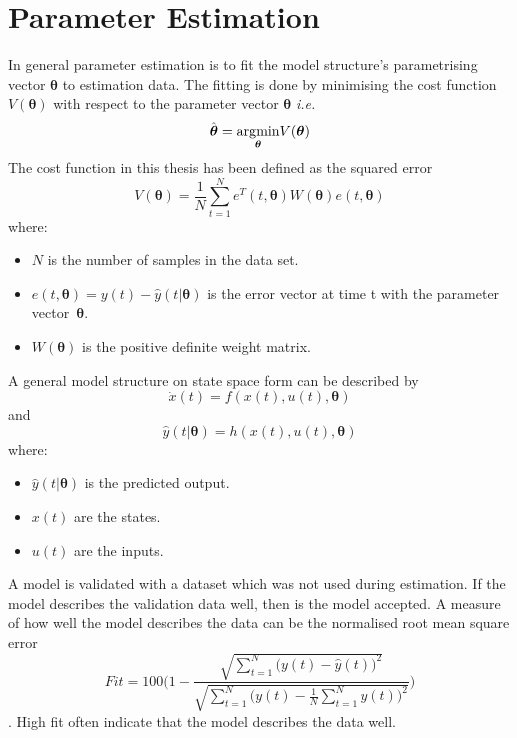 \section{Parameter Estimation} 
In general parameter estimation is to fit the model structure's parametrising vector $\boldsymbol{\theta}$ to estimation data. The fitting is done by minimising the cost function $V(\boldsymbol{\theta})$ with respect to the parameter vector $\boldsymbol{\theta}$ \emph{i.e.}
\begin{equation}
\hat{\boldsymbol{\theta}} = \underset{\boldsymbol{\theta}}{\operatorname*{\arg\!\min}} V(\boldsymbol{\theta})
\end{equation}
The cost function in this thesis has been defined as the squared error
\begin{equation}
    V(\boldsymbol{\theta}) = \frac{1}{N} \sum_{t=1}^{N} e^T(t,\boldsymbol{\theta}) W(\boldsymbol{\theta})  e(t,\boldsymbol{\theta})
\end{equation}
where:
\begin{itemize}
    \item $N$ is the number of samples in the data set.
    \item $e(t,\boldsymbol{\theta}) = y(t) - \hat{y}(t|\boldsymbol{\theta})$ is the error vector at time t with the parameter vector~$\boldsymbol{\theta}$.
    \item $W(\boldsymbol{\theta})$ is the positive definite weight matrix.
\end{itemize}

A general model structure on state space form can be described by
\begin{equation}
\dot{x}(t) = f(x(t), u(t), \boldsymbol{\theta})
\end{equation}
and
\begin{equation}
\hat{y}(t|\boldsymbol{\theta}) = h(x(t), u(t), \boldsymbol{\theta})
\end{equation}
 where:
 \begin{itemize}
  \item $\hat{y}(t|\boldsymbol{\theta})$ is the predicted output.
  \item $x(t)$ are the states. 
  \item $u(t)$ are the inputs. 
 \end{itemize}

A model is validated with a dataset which was not used during estimation. If the model describes the validation data well, then is the model accepted. A measure of how well the model describes the data can be the normalised root mean square error
\begin{equation}
Fit = 100 \Biggr(1 - \frac{\sqrt{\sum\limits_{t=1}^N \bigr(y(t) - \hat{y}(t)\bigl)^2}}{\sqrt{\sum\limits_{t=1}^N \bigr(y(t)-\frac{1}{N}\sum\limits_{t=1}^N y(t)\bigl)^2}}\Biggl)
\end{equation}. 
High fit often indicate that the model describes the data well. 
